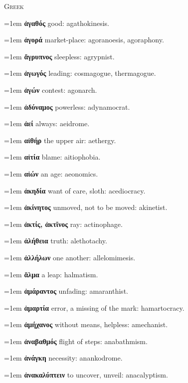{\color{rubric}\scshape Greek}\par\smallskip
\hangindent=1em \textbf{ἀγαθός} good: agathokinesis.\par
\hangindent=1em \textbf{ἀγορά} market-place: agoranoesis, agoraphony.\par
\hangindent=1em \textbf{ἄγρυπνος} sleepless: agrypnist.\par
\hangindent=1em \textbf{ἀγωγός} leading: cosmagogue, thermagogue.\par
\hangindent=1em \textbf{ἀγών} contest: agonarch.\par
\hangindent=1em \textbf{ἀδύναμος} powerless: adynamocrat.\par
\hangindent=1em \textbf{ἀεί} always: aeidrome.\par
\hangindent=1em \textbf{αἰθήρ} the upper air: aethergy.\par
\hangindent=1em \textbf{αἰτία} blame: aitiophobia.\par
\hangindent=1em \textbf{αἰών} an age: aeonomics.\par
\hangindent=1em \textbf{ἀκηδία} want of care, sloth: acediocracy.\par
\hangindent=1em \textbf{ἀκίνητος} unmoved, not to be moved: akinetist.\par
\hangindent=1em \textbf{ἀκτίς, ἀκτῖνος} ray: actinophage.\par
\hangindent=1em \textbf{ἀλήθεια} truth: alethotachy.\par
\hangindent=1em \textbf{ἀλλήλων} one another: allelomimesis.\par
\hangindent=1em \textbf{ἅλμα} a leap: halmatism.\par
\hangindent=1em \textbf{ἀμάραντος} unfading: amaranthist.\par
\hangindent=1em \textbf{ἁμαρτία} error, a missing of the mark: hamartocracy.\par
\hangindent=1em \textbf{ἀμήχανος} without means, helpless: amechanist.\par
\hangindent=1em \textbf{ἀναβαθμός} flight of steps: anabathmism.\par
\hangindent=1em \textbf{ἀνάγκη} necessity: anankodrome.\par
\hangindent=1em \textbf{ἀνακαλύπτειν} to uncover, unveil: anacalyptism.\par
